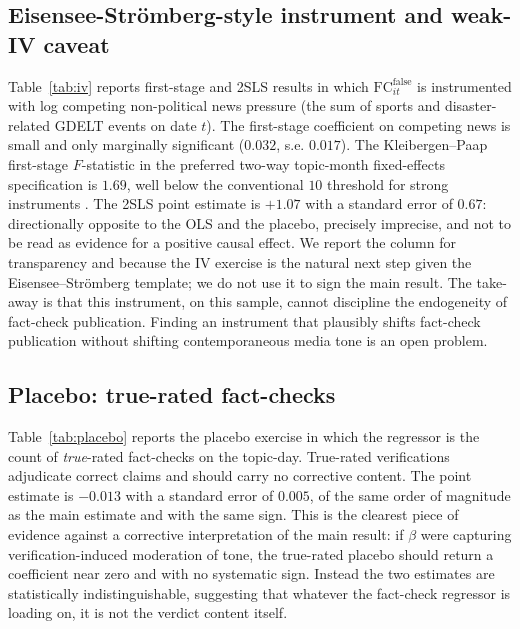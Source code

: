 \documentclass[12pt]{article}
\begin{document}
\subsection{Eisensee-Str\"omberg-style instrument and weak-IV caveat}

Table~\ref{tab:iv} reports first-stage and 2SLS results in which $\mathrm{FC}^{\text{false}}_{it}$ is instrumented with log competing non-political news pressure (the sum of sports and disaster-related GDELT events on date $t$). The first-stage coefficient on competing news is small and only marginally significant ($0.032$, s.e. $0.017$). The Kleibergen--Paap first-stage $F$-statistic in the preferred two-way topic-month fixed-effects specification is $1.69$, well below the conventional $10$ threshold for strong instruments \citep{stock2005}. The 2SLS point estimate is $+1.07$ with a standard error of $0.67$: directionally opposite to the OLS and the placebo, precisely imprecise, and not to be read as evidence for a positive causal effect. We report the column for transparency and because the IV exercise is the natural next step given the Eisensee--Str\"omberg template; we do not use it to sign the main result. The take-away is that this instrument, on this sample, cannot discipline the endogeneity of fact-check publication. Finding an instrument that plausibly shifts fact-check publication without shifting contemporaneous media tone is an open problem.



\subsection{Placebo: true-rated fact-checks}

Table~\ref{tab:placebo} reports the placebo exercise in which the regressor is the count of \emph{true}-rated fact-checks on the topic-day. True-rated verifications adjudicate correct claims and should carry no corrective content. The point estimate is $-0.013$ with a standard error of $0.005$, of the same order of magnitude as the main estimate and with the same sign. This is the clearest piece of evidence against a corrective interpretation of the main result: if $\beta$ were capturing verification-induced moderation of tone, the true-rated placebo should return a coefficient near zero and with no systematic sign. Instead the two estimates are statistically indistinguishable, suggesting that whatever the fact-check regressor is loading on, it is not the verdict content itself.
\end{document}
